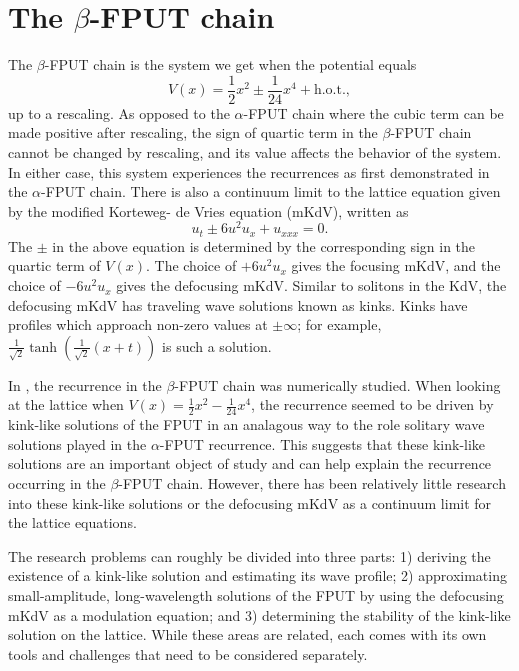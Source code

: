 \section{The \(\beta\)-FPUT chain}

The \(\beta\)-FPUT chain is the system we get when the potential equals
\begin{equation}
	V(x) = \frac 12 x^2 \pm \frac 1 {24}x^4 + \text{h.o.t.},
\end{equation}
up to a rescaling. As opposed to the \(\alpha\)-FPUT chain where the cubic term can be made positive after rescaling, the sign of quartic term in the \(\beta\)-FPUT chain cannot be changed by rescaling, and its value affects the behavior of the system. In either case, this system  experiences the recurrences as first demonstrated in the \(\alpha\)-FPUT chain. There is also a continuum limit to the lattice equation given by the modified Korteweg- de Vries equation (mKdV), written as
\begin{equation}
	u_t \pm 6 u^2 u_x + u_{xxx} = 0.
\end{equation}
The \(\pm\) in the above equation is determined by the corresponding sign in the quartic term of \(V(x)\). The choice of \(+6u^2u_x\) gives the focusing mKdV, and the choice of \(-6u^2u_x\) gives the defocusing mKdV. Similar to solitons in the KdV, the defocusing mKdV has traveling wave solutions known as kinks. Kinks have profiles which approach non-zero values at \(\pm \infty\); for example, \(\frac 1 {\sqrt 2} \tanh(\frac 1 {\sqrt 2} (x+t))\) is such a solution.

In \cite{pace2019beta}, the recurrence in the \(\beta\)-FPUT chain was numerically studied. When looking at the lattice when \(V(x) = \frac  12 x^2 - \frac 1 {24}x^4\), the recurrence seemed to be driven by kink-like solutions of the FPUT in an analagous way to the role solitary wave solutions played in the \(\alpha\)-FPUT recurrence. This suggests that these kink-like solutions are an important object of study and can help explain the recurrence occurring in the \(\beta\)-FPUT chain. However, there has been relatively little research into these kink-like solutions or the defocusing mKdV as a continuum limit for the lattice equations. 

The research problems can roughly be divided into three parts: 1) deriving the existence of a kink-like solution and estimating its wave profile; 2) approximating small-amplitude, long-wavelength solutions of the FPUT by using the defocusing mKdV as a modulation equation; and 3) determining the stability of the kink-like solution on the lattice. While these areas are related, each comes with its own tools and challenges that need to be considered separately. 


